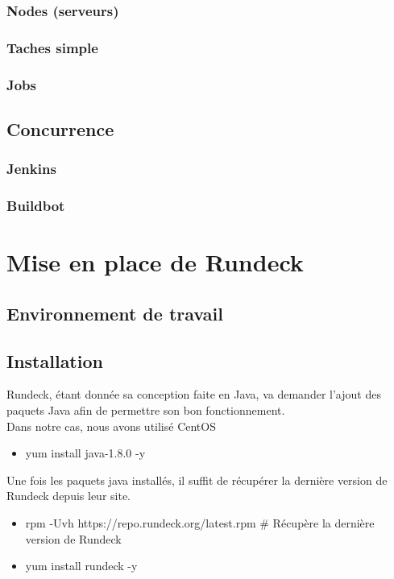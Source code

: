 \documentclass[11pt]{article}
\begin{document}
\subsubsection{Nodes (serveurs)}
\subsubsection{Taches simple}
\subsubsection{Jobs}

\subsection{Concurrence}
\subsubsection{Jenkins}
\subsubsection{Buildbot}

\section{Mise en place de Rundeck}

\subsection{Environnement de travail}

\subsection{Installation}

Rundeck, étant donnée sa conception faite en Java, va demander l'ajout des paquets Java afin de permettre son bon fonctionnement.
\\
\vspace{0.2cm}
Dans notre cas, nous avons utilisé CentOS 
\vspace{0.1cm}
\begin{itemize}
    \item yum install java-1.8.0 -y
\end{itemize}

\vspace{0.2cm}
Une fois les paquets java installés, il suffit de récupérer la dernière version de Rundeck depuis leur site.
\vspace{0.2cm}
\begin{itemize}
    \item rpm -Uvh https://repo.rundeck.org/latest.rpm \# Récupère la dernière version de Rundeck
    \item yum install rundeck -y
\end{itemize}{}
\end{document}
